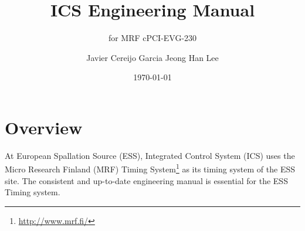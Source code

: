 \documentclass[11pt
  , a4paper
  , article
  , oneside
  , showtrims
]{memoir}
\begin{document}


\date{\today}




\title{ICS Engineering Manual}
\subtitle{for MRF cPCI-EVG-230}
\author{Javier Cereijo Garcia \newline Jeong Han Lee }



\showtrimson

\esstitle
\newpage
\tableofcontents
\newpage



\chapter{Overview}
At European Spallation Source (ESS), Integrated Control System (ICS) uses the Micro Research Finland (MRF) Timing System{\footnote{\url{http://www.mrf.fi/}}} as its timing system of the ESS site. The consistent and up-to-date engineering manual is essential for the ESS Timing system.
\end{document}
